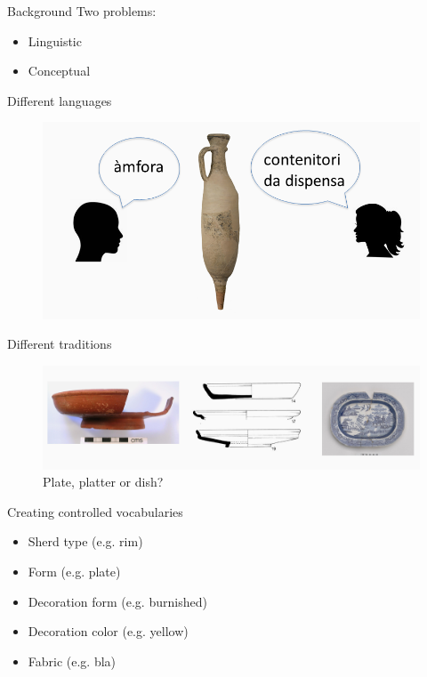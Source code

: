 \documentclass[xcolor=x11names, aspectratio=169,usenames,dvipsnames]{beamer}
\begin{document}
\begin{frame}{Background}
Two problems:
\begin{itemize}
\item Linguistic
\item Conceptual
\end{itemize}
\end{frame}

\begin{frame}{Different languages}
\begin{center}
\begin{figure}
\includegraphics[width=\textwidth]{img/tim_vocab_1.png}
\end{figure}
\end{center}
\end{frame}

\begin{frame}{Different traditions}
\begin{center}
\begin{figure}
\includegraphics[width=\textwidth]{img/tim_plate_platter_dish.jpg}
\caption{Plate, platter or dish?}
\end{figure}
\end{center}
\end{frame}

\begin{frame}{Creating controlled vocabularies}
\begin{itemize}
\item Sherd type (e.g. rim)
\item Form (e.g. plate)
\item Decoration form (e.g. burnished)
\item Decoration color (e.g. yellow)
\item Fabric (e.g. bla)
\end{itemize}
\end{frame}
\end{document}
